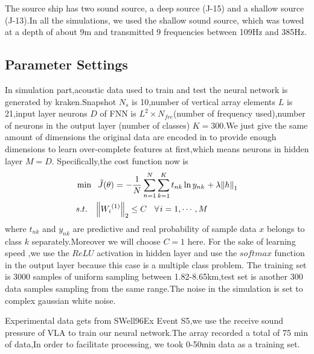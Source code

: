 The source ship has two sound source, a deep source (J-15) and a shallow source (J-13).In all the simulations, we used the shallow sound source,
which was towed at a depth of about 9m and transmitted 9 frequencies between 109Hz and 385Hz.

\subsection{Parameter Settings}
In simulation part,acoustic data used to train and test the neural network is generated by kraken.Snapshot $N_{s}$ is 10,number of vertical array elements $L$ is 21,input layer neurons $D$ of FNN is $L^{2} \times N_{fre}$(number of frequency used),number of neurons in the output layer (number of classes) $K = 300$.We just give the same amount of dimensions the original data are encoded in to provide enough dimensions to learn over-complete features at first,which means neurons in hidden layer $M = D$. Specifically,the cost function now is
\begin{equation}
\begin{split}
&\min {\kern 1pt} {\kern 1pt} {\kern 1pt} {\kern 1pt} {\kern 1pt} {\kern 1pt} \tilde J(\theta ){\kern 1pt} {\kern 1pt} {\kern 1pt} {\rm{ = }}{\kern 1pt} {\kern 1pt} {\kern 1pt} {\rm{ - }}{{\rm{1}} \over N}\sum\limits_{n = 1}^N {\sum\limits_{k = 1}^K {{t_{nk}}\ln {y_{nk}}{\kern 1pt} {\kern 1pt} {\kern 1pt} {\rm{ + }}{\kern 1pt} {\kern 1pt} \lambda {{\left\| h \right\|}_1}} }\\
& s.t.{\kern 1pt} {\kern 1pt} {\kern 1pt} {\kern 1pt} {\kern 1pt} {\kern 1pt} {\kern 1pt} {\kern 1pt} {\kern 1pt} {\kern 1pt} {\left\| {{W_i}^{(1)}} \right\|_2} \le C{\kern 1pt} {\kern 1pt} {\kern 1pt} {\kern 1pt} {\kern 1pt} {\kern 1pt} {\kern 1pt} {\kern 1pt} {\kern 1pt} \forall {\kern 1pt} i = 1, \cdots ,M\\
\end{split}
\end{equation}
where $t_{nk}$ and $y_{nk}$ are predictive and real probability of sample data $x$ belongs to class $k$ separately.Moreover we will choose $C=1$ here.
For the sake of learning speed ,we use the $ReLU$ activation in hidden layer and use the $softmax$
function in the output layer because this case is a multiple class problem.
The training set is 3000 samples of uniform sampling between 1.82\--8.65km,test set is another 300 data samples sampling from the same range.The noise in the simulation is set to complex gaussian white noise.

Experimental data gets from SWell96Ex Event S5,we use the receive sound pressure of VLA to train our neural network.The array recorded a total of 75 min of data,In order to facilitate processing, we took 0\--50min data as a training set.

